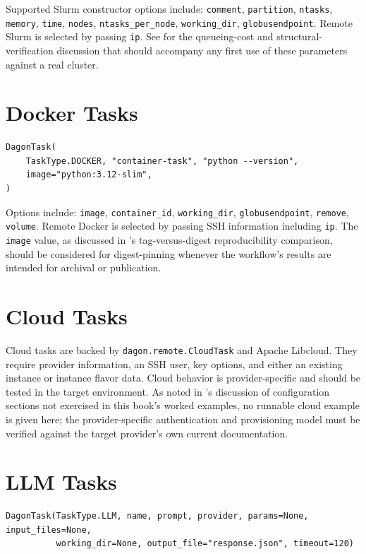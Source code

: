 Supported Slurm constructor options include: \texttt{comment},
\texttt{partition}, \texttt{ntasks}, \texttt{memory}, \texttt{time},
\texttt{nodes}, \texttt{ntasks\_per\_node}, \texttt{working\_dir},
\texttt{globusendpoint}. Remote Slurm is selected by passing \texttt{ip}.
See  for the queueing-cost and structural-verification
discussion that should accompany any first use of these parameters against
a real cluster.

\section{Docker Tasks}

\begin{lstlisting}
DagonTask(
    TaskType.DOCKER, "container-task", "python --version",
    image="python:3.12-slim",
)
\end{lstlisting}

Options include: \texttt{image}, \texttt{container\_id},
\texttt{working\_dir}, \texttt{globusendpoint}, \texttt{remove},
\texttt{volume}. Remote Docker is selected by passing SSH information
including \texttt{ip}. The \texttt{image} value, as discussed in
's tag-versus-digest reproducibility comparison, should be
considered for digest-pinning whenever the workflow's results are intended
for archival or publication.

\section{Cloud Tasks}

Cloud tasks are backed by \texttt{dagon.remote.CloudTask} and Apache
Libcloud. They require provider information, an SSH user, key options, and
either an existing instance or instance flavor data. Cloud behavior is
provider-specific and should be tested in the target environment. As noted
in 's discussion of configuration sections not
exercised in this book's worked examples, no runnable cloud example is
given here; the provider-specific authentication and provisioning model
must be verified against the target provider's own current documentation.

\section{LLM Tasks}

\begin{lstlisting}[caption={\texttt{LLMTask} constructor.}]
DagonTask(TaskType.LLM, name, prompt, provider, params=None, input_files=None,
          working_dir=None, output_file="response.json", timeout=120)
\end{lstlisting}

